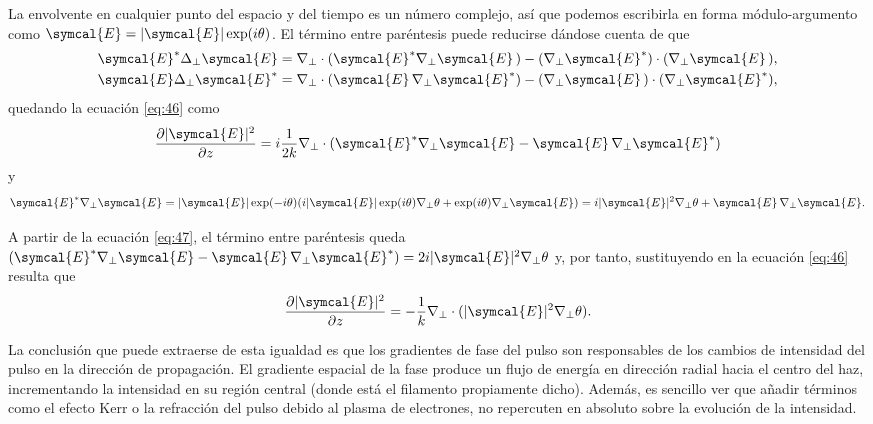 \documentclass{scrartcl} %
\newcommand*{\pdv}[2]{\frac{\partial#1}{\partial#2}}
\newcommand*{\grad}{\nabla}
\newcommand*{\laplacian}{\Delta}
\begin{document}
La envolvente en cualquier punto del espacio y del tiempo es un número complejo, así que podemos escribirla en forma módulo-argumento como $\symcal{E}=|\symcal{E}|\exp(i \theta)$. El término entre paréntesis puede reducirse dándose cuenta de que
\begin{align}
  \symcal{E}^{*}\laplacian_{\perp}\symcal{E} & = \grad_{\perp} \cdot (\symcal{E}^{*}\grad_{\perp}\symcal{E}\,) - (\grad_{\perp}\symcal{E}^{*}) \cdot (\grad_{\perp}\symcal{E}\,), \\
  \symcal{E}\laplacian_{\perp}\symcal{E}^{*} & = \grad_{\perp} \cdot (\symcal{E}\,\grad_{\perp}\symcal{E}^{*}) - (\grad_{\perp}\symcal{E}\,) \cdot (\grad_{\perp}\symcal{E}^{*}),
\end{align}
quedando la ecuación \eqref{eq:46} como
\begin{equation}\label{eq:47}
  \pdv{|\symcal{E}|^{2}}{z} = i \frac{1}{2k}\grad_{\perp}\cdot(\symcal{E}^{*} \grad_{\perp}\symcal{E} - \symcal{E}\,\grad_{\perp}\symcal{E}^{*})
\end{equation}
y
\begin{equation}\label{eq:47}
  \symcal{E}^{*}\grad_{\perp}\symcal{E} = |\symcal{E}|\exp(-i \theta)(i|\symcal{E}|\exp(i \theta)\grad_{\perp} \theta + \exp(i \theta)\grad_{\perp}\symcal{E}) = i|\symcal{E}|^{2}\grad_{\perp} \theta + \symcal{E}\,\grad_{\perp}\symcal{E}.
\end{equation}

A partir de la ecuación \eqref{eq:47}, el término entre paréntesis queda $(\symcal{E}^{*} \grad_{\perp}\symcal{E} - \symcal{E}\,\grad_{\perp}\symcal{E}^{*}) = 2i|\symcal{E}|^{2}\grad_{\perp} \theta$ y, por tanto, sustituyendo en la ecuación \eqref{eq:46} resulta que
\begin{equation}\label{eq:48}
  \pdv{|\symcal{E}|^{2}}{z} = - \frac{1}{k}\grad_{\perp} \cdot (|\symcal{E}|^{2}\grad_{\perp} \theta).
\end{equation}

La conclusión que puede extraerse de esta igualdad es que los gradientes de fase del pulso son responsables de los cambios de intensidad del pulso en la dirección de propagación. El gradiente espacial de la fase produce un flujo de energía en dirección radial hacia el centro del haz, incrementando la intensidad en su región central (donde está el filamento propiamente dicho). Además, es sencillo ver que añadir términos como el efecto Kerr o la refracción del pulso debido al plasma de electrones, no repercuten en absoluto sobre la evolución de la intensidad.
\end{document}
